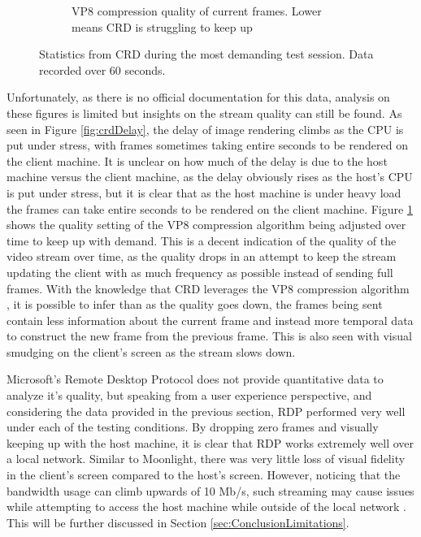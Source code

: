 \begin{figure}[h]
\begin{subfigure}{.33\textwidth}
    \captionsetup{width=.85\linewidth}
    \caption{VP8 compression quality of current frames. Lower means CRD is struggling to keep up}
    \label{fig:crdQuality}
  \end{subfigure}
  \captionsetup{width=.8\linewidth}
  \caption{Statistics from CRD during the most demanding test session. Data recorded over 60 seconds.}
  \label{fig:crdStats}
\end{figure}

Unfortunately, as there is no official documentation for this data, analysis on these figures is limited but insights on the stream quality can still be found.
As seen in Figure \ref{fig:crdDelay}, the delay of image rendering climbs as the CPU is put under stress, with frames sometimes taking entire seconds to be rendered on the client machine.
It is unclear on how much of the delay is due to the host machine versus the client machine, as the delay obviously rises as the host's CPU is put under stress, but it is clear that as the host machine is under heavy load the frames can take entire seconds to be rendered on the client machine.
Figure \ref{fig:crdQuality} shows the quality setting of the VP8 compression algorithm being adjusted over time to keep up with demand.
This is a decent indication of the quality of the video stream over time, as the quality drops in an attempt to keep the stream updating the client with as much frequency as possible instead of sending full frames.
With the knowledge that CRD leverages the VP8 compression algorithm \cite{miniorange_chromoting}, it is possible to infer than as the quality goes down, the frames being sent contain less information about the current frame and instead more temporal data to construct the new frame from the previous frame.
This is also seen with visual smudging on the client's screen as the stream slows down.

Microsoft's Remote Desktop Protocol does not provide quantitative data to analyze it's quality, but speaking from a user experience perspective, and considering the data provided in the previous section, RDP performed very well under each of the testing conditions.
By dropping zero frames and visually keeping up with the host machine, it is clear that RDP works extremely well over a local network.
Similar to Moonlight, there was very little loss of visual fidelity in the client's screen compared to the host's screen.
However, noticing that the bandwidth usage can climb upwards of 10 Mb/s, such streaming may cause issues while attempting to access the host machine while outside of the local network \cite{rdp_bandwidth}.
This will be further discussed in Section \ref{sec:ConclusionLimitations}.

